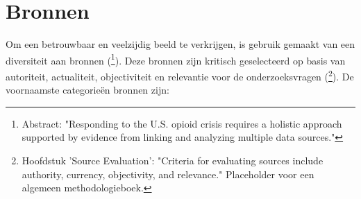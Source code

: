 \documentclass[11pt, a4paper]{report} %
\begin{document}
\section{Bronnen}
Om een betrouwbaar en veelzijdig beeld te verkrijgen, is gebruik gemaakt van een diversiteit aan bronnen (\cite{Scrivner2021InteractiveNetworkOpioid}\footnote{Abstract: "Responding to the U.S. opioid crisis requires a holistic approach supported by evidence from linking and analyzing multiple data sources."}). Deze bronnen zijn kritisch geselecteerd op basis van autoriteit, actualiteit, objectiviteit en relevantie voor de onderzoeksvragen (\cite{SomeResearchMethodsTextbook}\footnote{Hoofdstuk 'Source Evaluation': "Criteria for evaluating sources include authority, currency, objectivity, and relevance." Placeholder voor een algemeen methodologieboek.}). De voornaamste categorieën bronnen zijn:
\end{document}
